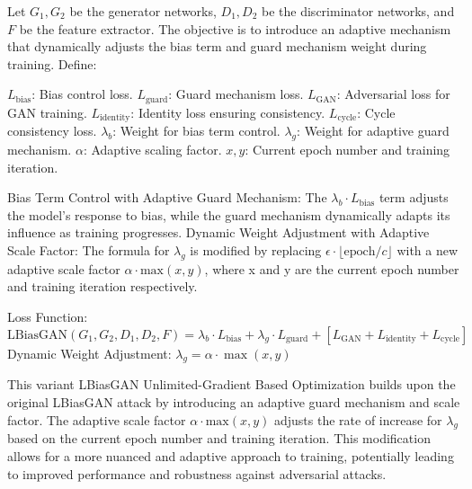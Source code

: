 Let $G_1, G_2$ be the generator networks, $D_1, D_2$ be the discriminator networks, and $F$ be the feature extractor. The objective is to introduce an adaptive mechanism that dynamically adjusts the bias term and guard mechanism weight during training. Define:

$L_{\text{bias}}$: Bias control loss.
$L_{\text{guard}}$: Guard mechanism loss.
$L_{\text{GAN}}$: Adversarial loss for GAN training.
$L_{\text{identity}}$: Identity loss ensuring consistency.
$L_{\text{cycle}}$: Cycle consistency loss.
$\lambda_b$: Weight for bias term control.
$\lambda_g$: Weight for adaptive guard mechanism.
$\alpha$: Adaptive scaling factor.
$x, y$: Current epoch number and training iteration.

Bias Term Control with Adaptive Guard Mechanism: The $ \lambda_b \cdot L_{\text{bias}} $ term adjusts the model's response to bias, while the guard mechanism dynamically adapts its influence as training progresses.
Dynamic Weight Adjustment with Adaptive Scale Factor: The formula for $ \lambda_g $ is modified by replacing $ \epsilon \cdot \lfloor \text{epoch} / c \rfloor $ with a new adaptive scale factor $ \alpha \cdot \text{max}(x, y) $, where x and y are the current epoch number and training iteration respectively.

Loss Function:
$ \text{LBiasGAN}(G_1, G_2, D_1, D_2, F) = \lambda_b \cdot L_{\text{bias}} + \lambda_g \cdot L_{\text{guard}} + [L_{\text{GAN}} + L_{\text{identity}} + L_{\text{cycle}}] $
Dynamic Weight Adjustment:
$ \lambda_g = \alpha \cdot \max(x, y) $

This variant  LBiasGAN Unlimited-Gradient Based Optimization builds upon the original LBiasGAN attack by introducing an adaptive guard mechanism and scale factor. The adaptive scale factor $ \alpha \cdot \text{max}(x, y) $ adjusts the rate of increase for $ \lambda_g $ based on the current epoch number and training iteration. This modification allows for a more nuanced and adaptive approach to training, potentially leading to improved performance and robustness against adversarial attacks.